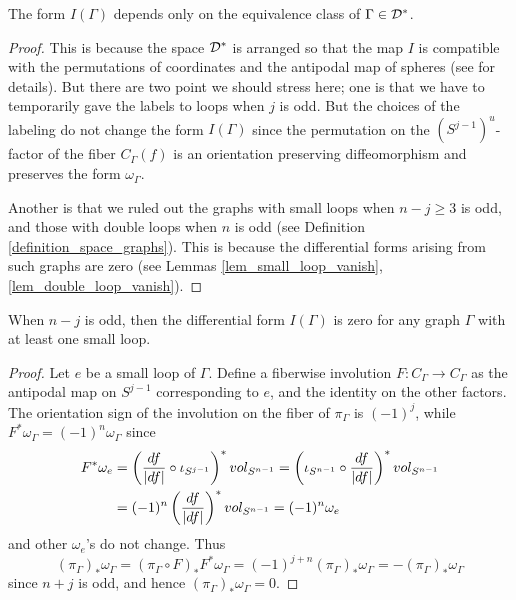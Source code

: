 \begin{prop}
The form $I(\Gamma )$ depends only on the equivalence class of $\Gamma \in \mathcal{D}^*$.
\end{prop}


\begin{proof}
This is because the space $\mathcal{D}^*$ is arranged so that the map $I$ is compatible with the permutations of coordinates
and the antipodal map of spheres (see \cite{CCL02} for details).
But there are two point we should stress here; one is that we have to temporarily gave the labels to loops when $j$ is
odd.
But the choices of the labeling do not change the form $I(\Gamma )$ since the permutation on the $(S^{j-1})^u$-factor
of the fiber $C_{\Gamma}(f)$ is an orientation preserving diffeomorphism and preserves the form $\omega_{\Gamma}$.


Another is that we ruled out the graphs with small loops when $n-j \ge 3$ is odd, and those with double loops when $n$ is
odd (see Definition \ref{definition_space_graphs}).
This is because the differential forms arising from such graphs are zero (see Lemmas \ref{lem_small_loop_vanish},
\ref{lem_double_loop_vanish}).
\end{proof}


\begin{lem}\label{lem_small_loop_vanish}
When $n-j$ is odd, then the differential form $I(\Gamma )$ is zero for any graph $\Gamma$ with at least one small loop.
\end{lem}


\begin{proof}
Let $e$ be a small loop of $\Gamma$.
Define a fiberwise involution $F:C_{\Gamma} \to C_{\Gamma}$ as the antipodal map on $S^{j-1}$ corresponding to $e$,
and the identity on the other factors.
The orientation sign of the involution on the fiber of $\pi_{\Gamma}$ is $(-1)^j$, while
$F^* \omega_{\Gamma}=(-1)^n \omega_{\Gamma}$ since
\begin{align*}
 F^* \omega_e &= \left( \frac{df}{\lvert {df} \rvert} \circ \iota_{S^{j-1}} \right)^* vol_{S^{n-1}}
  = \left( \iota_{S^{n-1}} \circ \frac{df}{\lvert {df} \rvert} \right)^* vol_{S^{n-1}} \\
 &= (-1)^n \left( \frac{df}{\lvert {df} \rvert} \right)^* vol_{S^{n-1}} =(-1)^n \omega_e
\end{align*}
and other $\omega_e$'s do not change.
Thus
\[
 (\pi_{\Gamma})_* \omega_{\Gamma} = (\pi_{\Gamma} \circ F)_* F^* \omega_{\Gamma}
 = (-1)^{j+n}(\pi_{\Gamma})_* \omega_{\Gamma} = -(\pi_{\Gamma})_* \omega_{\Gamma}
\]
since $n+j$ is odd, and hence $(\pi_{\Gamma})_* \omega_{\Gamma}=0$.
\end{proof}


